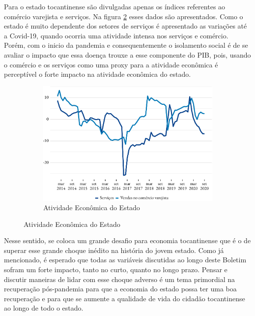 \par Para o estado tocantinense são divulgadas apenas os índices referentes ao comércio varejista e serviços. Na figura \ref{fig:pmc} esses dados são apresentados. Como o estado é muito dependente dos setores de serviços é apresentado as variações até a Covid-19, quando ocorria uma atividade intensa nos serviços e comércio. Porém, com o inicio da pandemia e consequentemente o isolamento social é de se avaliar o impacto que essa doença trouxe a esse componente do PIB, pois, usando o comércio e os serviços como uma proxy para a atividade econômica é perceptível o forte impacto na atividade econômica do estado.

\begin{figure}[!h]
	\begin{subfigure}{\linewidth}
		\caption{Atividade Econômica do Estado}
		\label{fig:pmc}
		\includegraphics{fig/pmc_ibge-1.pdf}
	\end{subfigure}
\end{figure}

\par Nesse sentido, se coloca um grande desafio para economia tocantinense que é o de superar esse grande choque inédito na história do jovem estado. Como já mencionado, é esperado que todas as variáveis discutidas ao longo deste Boletim sofram um forte impacto, tanto no curto, quanto no longo prazo. Pensar e discutir maneiras de lidar com esse choque adverso é um tema primordial na recuperação pós-pandemia para que a economia do  estado possa ter uma boa recuperação e para que se aumente a qualidade de vida do cidadão tocantinense ao longo de todo o estado.